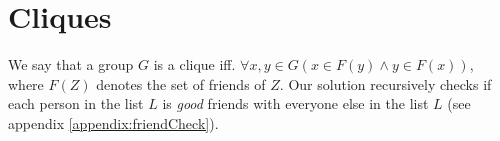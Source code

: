 %
%

\section{Cliques}
We say that a group $G$ is a clique iff. $\forall x,y \in G ( x \in F(y) \land
y \in F(x) )$, where $F(Z)$ denotes the set of friends of $Z$. Our solution
recursively checks if each person in the list $L$ is {\it good} friends with
everyone else in the list $L$ (see appendix \ref{appendix:friendCheck}).

